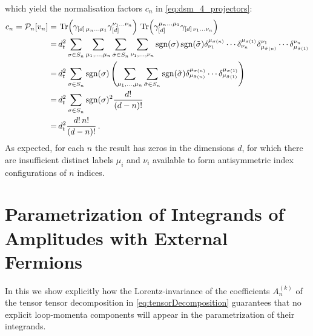 which yield the normalisation factors $c_n$ in \cref{eq:dsm_4_projectors}:
\begin{align}
  \begin{split}
    \label{eq:cnCalc}
    c_n=\mathcal{P}_n [v_n] =&\,
%
    \Tr(\gamma_{[d]\,\mu_n \ldots \mu_1} \gamma_{[d]}^
    {\nu_1 \ldots \nu_n}) \,
%
    \Tr(\gamma_{[d]}^{\mu_n \ldots \mu_1} \gamma_{
    [d]\,\nu_1 \ldots \nu_n}) \\
    =&\,
    d_t^2 \sum_{\sigma\in  S_n} 
    \sum_{\mu_1,\ldots,\mu_n}
    \sum_{\tilde \sigma\in S_n}
    \sum_{\nu_1,\ldots,\nu_n}
%
    \sgn(\sigma)
    \sgn(\tilde\sigma)
    \delta^{\mu_{\sigma(n)}}_{\nu_1}\cdots\delta^{\mu_{\sigma(1)}}_{\nu_n}
    \delta_{\mu_{\tilde\sigma(n)}}^{\nu_1}\cdots
    \delta_{\mu_{\tilde\sigma(1)}}^{\nu_n}
    \\
%
    =&\,d_t^2 \sum_{\sigma\in  S_n} 
    \sgn(\sigma)
    \left(
    \sum_{\mu_1,\ldots,\mu_n}\sum_{\tilde \sigma\in S_n}
%
    \sgn(\tilde\sigma)
    \delta^{\mu_{\sigma(n)}}_{\mu_{\tilde\sigma(n)}}
    \cdots
    \delta^{\mu_{\sigma(1)}}_{\mu_{\tilde\sigma(1)}}
    \right)
    \\
%
    =&\, d_t^2 \sum_{\sigma\in  S_n} 
    \sgn(\sigma)^2 \frac{d!}{(d-n)!}\\
    =&\, d_t^2 \frac{d!\,n!}{(d-n)!}\,.
  \end{split}
\end{align}
As expected, for each $n$ the result has zeros in the dimensions
$d$, for which there are insufficient distinct labels 
$\mu_i$ and $\nu_i$ available to form antisymmetric index 
configurations of $n$ indices.



\chapter{Parametrization of Integrands of Amplitudes with External Fermions}
\label{sec:ParamIntegrands}

In this  we show
explicitly how the Lorentz-invariance of the coefficients $A_n^{(k)}$ of the
tensor tensor decomposition in \cref{eq:tensorDecomposition} guarantees that
no explicit loop-momenta components will appear in the parametrization of their integrands.


